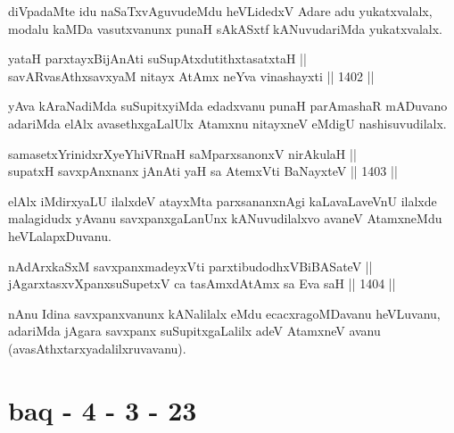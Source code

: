 \begin{artha}
diVpadaMte idu naSaTxvAguvudeMdu heVLidedxV Adare adu yukatxvalalx, modalu kaMDa vasutxvanunx punaH sAkASxtf kANuvudariMda yukatxvalalx.
\end{artha}


\begin{shl}
yataH parxtayxBijAnAti suSupAtxdutithxtasatxtaH || \\
savARvasAthxsavxyaM nitayx AtAmx neYva vinashayxti \hfill || 1402 ||  
\end{shl}

\begin{artha}
yAva kAraNadiMda suSupitxyiMda edadxvanu punaH parAmashaR mADuvano adariMda elAlx avasethxgaLalUlx Atamxnu nitayxneV eMdigU nashisuvudilalx.
\end{artha}


\begin{shl}
samasetxYrinidxrXyeYhiVRnaH saMparxsanonxV nirAkulaH ||  \\
supatxH savxpAnxnanx jAnAti yaH sa AtemxVti BaNayxteV \hfill || 1403 ||  
\end{shl}

\begin{artha}
elAlx iMdirxyaLU ilalxdeV atayxMta parxsananxnAgi kaLavaLaveVnU ilalxde malagidudx yAvanu savxpanxgaLanUnx kANuvudilalxvo avaneV AtamxneMdu heVLalapxDuvanu.
\end{artha}


\begin{shl}
nAdArxkaSxM savxpanxmadeyxVti parxtibudodhxV\s BiBASateV ||  \\
jAgarxtasxvXpanxsuSupetxV ca tasAmxdAtAmx sa Eva saH \hfill || 1404 ||  
\end{shl}

\begin{artha}
nAnu Idina savxpanxvanunx kANalilalx eMdu ecacxragoMDavanu heVLuvanu, adariMda jAgara savxpanx suSupitxgaLalilx adeV AtamxneV avanu (avasAthxtarxyadalilxruvavanu).
\end{artha}

\section*{baq - 4 - 3 - 23}


